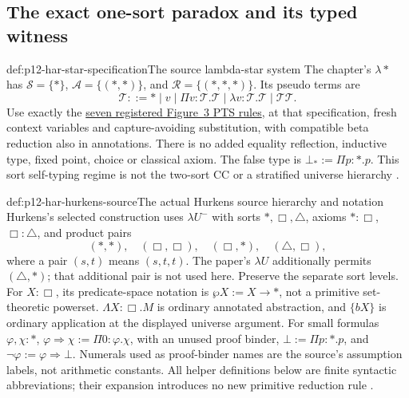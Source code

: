 \subsection{The exact one-sort paradox and its typed witness}

\begin{hbdefinition}{def:p12-har-star-specification}{The source lambda-star system}
The chapter's \(\lambda\ast\) has
\(\mathcal S=\{\ast\}\), \(\mathcal A=\{(\ast,\ast)\}\),
and \(\mathcal R=\{(\ast,\ast,\ast)\}\). Its pseudo terms are
\[
 \mathcal T::=\ast\mid v\mid\Pi v:\mathcal T.\mathcal T
       \mid\lambda v:\mathcal T.\mathcal T\mid\mathcal T\mathcal T.
\]
Use exactly the \hyperref[sheet:p12-har-pts]{seven registered Figure~3 PTS rules}, at that specification,
fresh context variables and capture-avoiding substitution, with compatible
beta reduction also in annotations. There is no added equality reflection,
inductive type, fixed point, choice or classical axiom. The false type is
\(\bot_\ast:=\Pi p:\ast.p\). This sort self-typing regime is
not the two-sort CC or a stratified universe hierarchy
\cite[p.~1201]{BarendregtGeuvers2001}.
\end{hbdefinition}

\begin{hbdefinition}{def:p12-har-hurkens-source}{The actual Hurkens source hierarchy and notation}
Hurkens's selected construction uses \(\lambda U^-\) with sorts
\(\ast,\Box,\triangle\), axioms
\(\ast:\Box\), \(\Box:\triangle\), and product pairs
\[
 (\ast,\ast),\quad(\Box,\Box),\quad(\Box,\ast),
 \quad(\triangle,\Box),
\]
where a pair \((s,t)\) means \((s,t,t)\). The paper's
\(\lambda U\) additionally permits \((\triangle,\ast)\);
that additional pair is not used here. Preserve the separate sort levels.
For \(X:\Box\), its predicate-space notation is
\(\wp X:=X\to\ast\), not a primitive set-theoretic powerset.
\(\Lambda X:\Box.M\) is ordinary annotated abstraction, and
\(\{bX\}\) is ordinary application at the displayed universe argument.
For small formulas \(\varphi,\chi:\ast\),
\(\varphi\Rightarrow\chi:=\Pi 0:\varphi.\chi\), with an
unused proof binder, \(\bot:=\Pi p:\ast.p\), and
\(\neg\varphi:=\varphi\Rightarrow\bot\). Numerals used as
proof-binder names are the source's assumption labels, not arithmetic
constants. All helper definitions below are finite syntactic abbreviations;
their expansion introduces no new primitive reduction rule
\cite[sections~2--3, pp.~266--269]{Hurkens1995LambdaStar}.
\end{hbdefinition}

